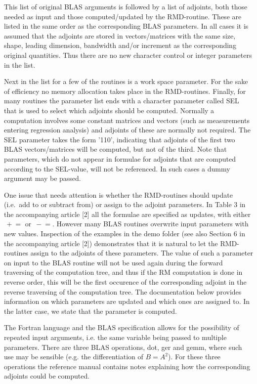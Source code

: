 \documentclass[a4paper]{article}
\newcommand{\minuseq}{\ensuremath{\,-\!\!=}}
\newcommand{\pluseq}{\ensuremath{\,+\!\!=}}
\begin{document}
This list of original BLAS arguments is followed by a list of adjoints, both
those needed as input and those computed/updated by the RMD-routine. These are
listed in the same order as the corresponding BLAS parameters. In all cases it
is assumed that the adjoints are stored in vectors/matrices with the same size,
shape, leading dimension, bandwidth and/or increment as the corresponding
original quantities. Thus there are no new character control or integer
parameters in the list.

Next in the list for a few of the routines is a work space parameter. For the
sake of efficiency no memory allocation takes place in the RMD-routines.
Finally, for many routines the parameter list ends with a character parameter
called SEL that is used to select which adjoints should be computed. Normally
a computation involves some constant matrices and vectors (such as measurements
entering regression analysis) and adjoints of these are normally not required.
The SEL parameter takes the form '110', indicating that adjoints of the first
two BLAS vectors/matrices will be computed, but not of the third. Note that
parameters, which do not appear in formulae for adjoints that are computed
according to the SEL-value, will not be referenced. In such cases a dummy
argument may be passed.

One issue that needs attention is whether the RMD-routines should update (i.e.\
add to or subtract from) or assign to the adjoint parameters. In Table 3 in
the accompanying article [2] all the formulae are specified as updates, with
either $\pluseq$ or $\minuseq$. However many BLAS routines overwrite input
parameters with new values. Inspection of the examples in the demo folder (see
also Section 6 in the accompanying article [2]) demonstrates that it is natural
to let the RMD-routines assign to the adjoints of these parameters. The value
of such a parameter on input to the BLAS routine will not be used again during
the forward traversing of the computation tree, and thus if the RM computation
is done in reverse order, this will be the first occurence of the corresponding
adjoint in the reverse traversing of the computation tree. The documentation
below provides information on which parameters are updated and which ones are
assigned to. In the latter case, we state that the parameter is computed.

The Fortran language and the BLAS specification allows for the possibility of
repeated input arguments, i.e. the same variable being passed to multiple
parameters. There are three BLAS operations, dot, ger and gemm, where such use
may be sensible (e.g. the differentiation of $B = A^2$). For these three
operations the reference manual contains notes explaining how the corresponding
adjoints could be computed.
\end{document}
